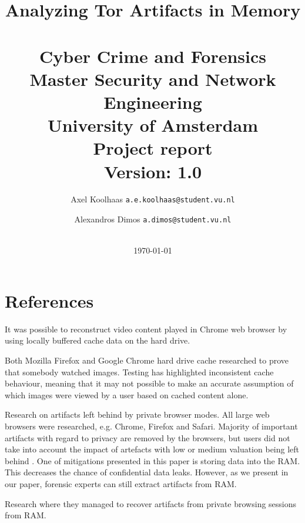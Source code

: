 \documentclass[a4paper,11pt]{article}
\begin{document}
\title{Analyzing Tor Artifacts in Memory \\~\\
\large{Cyber Crime and Forensics \\
Master Security and Network Engineering\\  University of Amsterdam\\
Project report\\}
\textbf{Version:} 1.0}
\author{
    Axel Koolhaas \texttt{a.e.koolhaas@student.vu.nl} \and
    Alexandros Dimos \texttt{a.dimos@student.vu.nl}\\
    \\
}
\date{
    \textnormal \today
}
\maketitle

\clearpage


\clearpage

\tableofcontents
\clearpage

\section{References}
It was possible to reconstruct video content played in Chrome web browser by using
locally buffered cache data on the hard drive.
\cite{horsman2018reconstructing}

Both Mozilla Firefox and Google Chrome hard drive cache researched to
prove that somebody watched images. Testing has highlighted inconsistent cache
behaviour, meaning that it may not possible to make an accurate
assumption of which images were viewed by a user based on cached
content alone.
\cite{horsman2018didn}

Research on artifacts left behind by private browser modes. All large
web browsers were researched, e.g. Chrome, Firefox and
Safari. Majority of important artifacts with regard to privacy are
removed by the browsers, but users did not take into account the
impact of artefacts with low or medium valuation being left behind
\cite{tsalis2017exploring}. One of mitigations presented in this paper
is storing data into the RAM. This decreases the chance of
confidential data leaks. However, as we present in our paper, forensic
experts can still extract artifacts from RAM.

Research where they managed to recover artifacts from private browsing
sessions from RAM. \cite{yang2017applying}








\printbibliography
\end{document}

